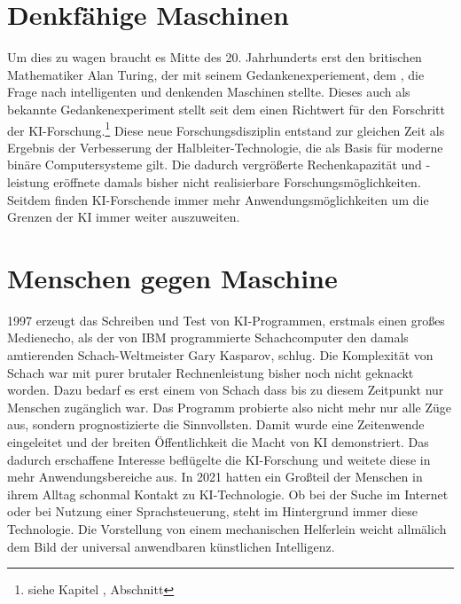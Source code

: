 \documentclass[12pt,german,ngerman]{report}
\begin{document}
    \section{Denkfähige Maschinen}
        Um dies zu wagen braucht es Mitte des 20. Jahrhunderts erst den britischen Mathematiker Alan Turing, 
        der mit seinem Gedankenexperiement, dem , 
        die Frage nach intelligenten und denkenden Maschinen stellte.
        Dieses auch als  bekannte Gedankenexperiment stellt seit dem einen 
        Richtwert für den Forschritt der KI-Forschung.\footnote{siehe Kapitel , Abschnitt }
        Diese neue Forschungsdisziplin entstand zur gleichen Zeit als Ergebnis 
        der Verbesserung der Halbleiter-Technologie, die als Basis für 
        moderne binäre Computersysteme gilt. Die dadurch vergrößerte Rechenkapazität und -leistung 
        eröffnete damals bisher nicht realisierbare Forschungsmöglichkeiten. 
        Seitdem finden KI-Forschende immer mehr Anwendungsmöglichkeiten um die Grenzen der KI immer weiter auszuweiten.
    
    \section{Menschen gegen Maschine}
        1997 erzeugt das Schreiben und Test von KI-Programmen, erstmals einen großes Medienecho, 
        als der von IBM programmierte Schachcomputer
         den damals amtierenden Schach-Weltmeister Gary Kasparov, schlug.\cite{chessbase2017kasparovdeepblue} 
        Die Komplexität von Schach war mit purer brutaler
        Rechnenleistung bisher noch nicht geknackt worden. Dazu bedarf es erst einem  von Schach dass bis zu diesem
        Zeitpunkt nur Menschen zugänglich war. Das Programm probierte also nicht mehr nur alle Züge aus, sondern prognostizierte die 
        Sinnvollsten. Damit wurde eine Zeitenwende eingeleitet und der breiten Öffentlichkeit die Macht von KI demonstriert.
        Das dadurch erschaffene Interesse beflügelte die KI-Forschung und weitete diese in mehr Anwendungsbereiche aus.
        In 2021 hatten ein Großteil der Menschen in ihrem Alltag schonmal Kontakt zu KI-Technologie. 
        Ob bei der Suche im Internet oder bei Nutzung einer Sprachsteuerung, steht im Hintergrund immer diese Technologie.
        Die Vorstellung von einem mechanischen Helferlein weicht allmälich dem Bild der universal anwendbaren künstlichen Intelligenz.
        
\end{document}
